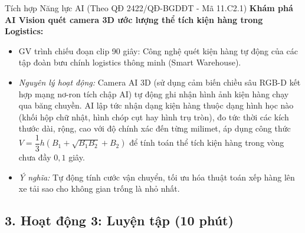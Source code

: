 \documentclass[12pt, a4paper]{article}
\begin{document}
\begin{aibox}{Tích hợp Năng lực AI (Theo QĐ 2422/QĐ-BGDĐT - Mã 11.C2.1)}
    \textbf{Khám phá AI Vision quét camera 3D ước lượng thể tích kiện hàng trong Logistics:}
    \begin{itemize}[leftmargin=0.6cm]
        \item GV trình chiếu đoạn clip 90 giây: Công nghệ quét kiện hàng tự động của các tập đoàn bưu chính logistics thông minh (Smart Warehouse).
        \item \textit{Nguyên lý hoạt động:} Camera AI 3D (sử dụng cảm biến chiều sâu RGB-D kết hợp mạng nơ-ron tích chập AI) tự động ghi nhận hình ảnh kiện hàng chạy qua băng chuyền. AI lập tức nhận dạng kiện hàng thuộc dạng hình học nào (khối hộp chữ nhật, hình chóp cụt hay hình trụ tròn), đo tức thời các kích thước dài, rộng, cao với độ chính xác đến từng milimet, áp dụng công thức $V = \dfrac{1}{3}h(B_1 + \sqrt{B_1 B_2} + B_2)$ để tính toán thể tích kiện hàng trong vòng chưa đầy $0{,}1$ giây.
        \item \textit{Ý nghĩa:} Tự động tính cước vận chuyển, tối ưu hóa thuật toán xếp hàng lên xe tải sao cho không gian trống là nhỏ nhất.
    \end{itemize}
\end{aibox}

\subsection*{3. Hoạt động 3: Luyện tập (10 phút)}
\end{document}
